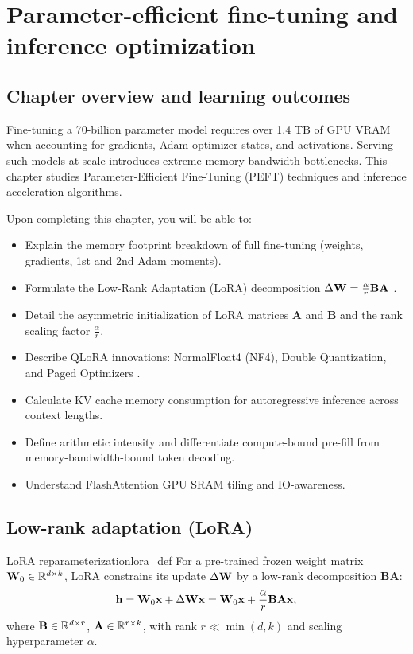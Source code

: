 \documentclass[../../main.tex]{subfiles}
\begin{document}
\chapter{Parameter-efficient fine-tuning and inference optimization}
\label{ch:peft_inference_optimization}

\section{Chapter overview and learning outcomes}
Fine-tuning a 70-billion parameter model requires over 1.4 TB of GPU VRAM when accounting for gradients, Adam optimizer states, and activations. Serving such models at scale introduces extreme memory bandwidth bottlenecks. This chapter studies Parameter-Efficient Fine-Tuning (PEFT) techniques and inference acceleration algorithms.

Upon completing this chapter, you will be able to:
\begin{itemize}
    \item Explain the memory footprint breakdown of full fine-tuning (weights, gradients, 1st and 2nd Adam moments).
    \item Formulate the Low-Rank Adaptation (LoRA) decomposition $\Delta \mathbf{W} = \frac{\alpha}{r} \mathbf{B} \mathbf{A}$ \citep{hu2021lora}.
    \item Detail the asymmetric initialization of LoRA matrices $\mathbf{A}$ and $\mathbf{B}$ and the rank scaling factor $\frac{\alpha}{r}$.
    \item Describe QLoRA innovations: NormalFloat4 (NF4), Double Quantization, and Paged Optimizers \citep{dettmers2023qlora}.
    \item Calculate KV cache memory consumption for autoregressive inference across context lengths.
    \item Define arithmetic intensity and differentiate compute-bound pre-fill from memory-bandwidth-bound token decoding.
    \item Understand FlashAttention GPU SRAM tiling and IO-awareness.
\end{itemize}

\section{Low-rank adaptation (LoRA)}
\begin{definition}{LoRA reparameterization}{lora_def}
For a pre-trained frozen weight matrix $\mathbf{W}_0 \in \mathbb{R}^{d \times k}$, LoRA \citep{hu2021lora} constrains its update $\Delta \mathbf{W}$ by a low-rank decomposition $\mathbf{B} \mathbf{A}$:
\begin{equation}
\label{eq:lora_eq}
\mathbf{h} = \mathbf{W}_0 \mathbf{x} + \Delta \mathbf{W} \mathbf{x} = \mathbf{W}_0 \mathbf{x} + \frac{\alpha}{r} \mathbf{B} \mathbf{A} \mathbf{x},
\end{equation}
where $\mathbf{B} \in \mathbb{R}^{d \times r}$, $\mathbf{A} \in \mathbb{R}^{r \times k}$, with rank $r \ll \min(d, k)$ and scaling hyperparameter $\alpha$.
\end{definition}
\end{document}
